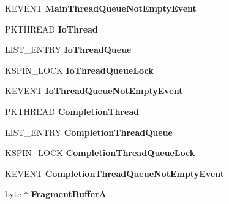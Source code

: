 \begin{DoxyCompactItemize}
\mbox{\label{struct_encrypted_io_queue_a6781cbc734f993da5b5c9efa8a4b2066}} 
K\+E\+V\+E\+NT {\bfseries Main\+Thread\+Queue\+Not\+Empty\+Event}
\item 
\mbox{\label{struct_encrypted_io_queue_a7028ed7665f93b68879f6f5dff26deb1}} 
P\+K\+T\+H\+R\+E\+AD {\bfseries Io\+Thread}
\item 
\mbox{\label{struct_encrypted_io_queue_a0f5ec8457f0a923edb9e751d80e8fc49}} 
L\+I\+S\+T\+\_\+\+E\+N\+T\+RY {\bfseries Io\+Thread\+Queue}
\item 
\mbox{\label{struct_encrypted_io_queue_a82ec5a9ae44baddfb39225d04e059731}} 
K\+S\+P\+I\+N\+\_\+\+L\+O\+CK {\bfseries Io\+Thread\+Queue\+Lock}
\item 
\mbox{\label{struct_encrypted_io_queue_a581eb1146d99eed63e59e4ceac0f4a4c}} 
K\+E\+V\+E\+NT {\bfseries Io\+Thread\+Queue\+Not\+Empty\+Event}
\item 
\mbox{\label{struct_encrypted_io_queue_afe11ec802ece7ecf9b84544972eea6e3}} 
P\+K\+T\+H\+R\+E\+AD {\bfseries Completion\+Thread}
\item 
\mbox{\label{struct_encrypted_io_queue_a840b95e9ee0f0738fda62cc6a41e791c}} 
L\+I\+S\+T\+\_\+\+E\+N\+T\+RY {\bfseries Completion\+Thread\+Queue}
\item 
\mbox{\label{struct_encrypted_io_queue_a472c2fe1ec14212bb231b2f4ab99240b}} 
K\+S\+P\+I\+N\+\_\+\+L\+O\+CK {\bfseries Completion\+Thread\+Queue\+Lock}
\item 
\mbox{\label{struct_encrypted_io_queue_a821ad8b3e79d5b3694f7e2af8a05b0e6}} 
K\+E\+V\+E\+NT {\bfseries Completion\+Thread\+Queue\+Not\+Empty\+Event}
\item 
\mbox{\label{struct_encrypted_io_queue_a66550aa6a4873778ec6cc1d2bdb40841}} 
byte $\ast$ {\bfseries Fragment\+BufferA}
\item 
\mbox{\label{struct_encrypted_io_queue_aac0d869d6473a8e0777060be28d6cbec}} 

\end{DoxyCompactItemize}
